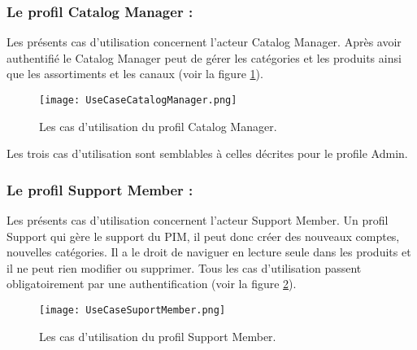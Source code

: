 \subsubsection{Le profil Catalog Manager :}
Les présents cas d’utilisation concernent l’acteur  Catalog Manager. Après avoir authentifié le Catalog Manager peut de gérer les catégories et les produits ainsi que les assortiments et les canaux (voir la figure \ref{fig:UseCaseCatalogManager}).
\begin{figure}[ht]
  \centering
  \texttt{[image: UseCaseCatalogManager.png]}
  \caption{Les cas d'utilisation du profil Catalog Manager.}
  \label{fig:UseCaseCatalogManager}
\end{figure}
\FloatBarrier

Les trois cas d'utilisation sont semblables à celles décrites pour le profile Admin.

\subsubsection{Le profil Support Member :}
Les présents cas d’utilisation concernent l’acteur  Support Member. Un profil Support qui gère le support du PIM, il peut donc créer des nouveaux comptes, nouvelles catégories.
Il a le droit de naviguer en lecture seule dans les produits et il ne peut rien modifier ou supprimer. Tous les cas d’utilisation passent obligatoirement par une authentification (voir la figure \ref{fig:UseCaseSupportMember}).
\begin{figure}[ht]
  \centering
  \texttt{[image: UseCaseSuportMember.png]}
  \caption{Les cas d'utilisation du profil Support Member.}
  \label{fig:UseCaseSupportMember}
\end{figure}
\FloatBarrier

